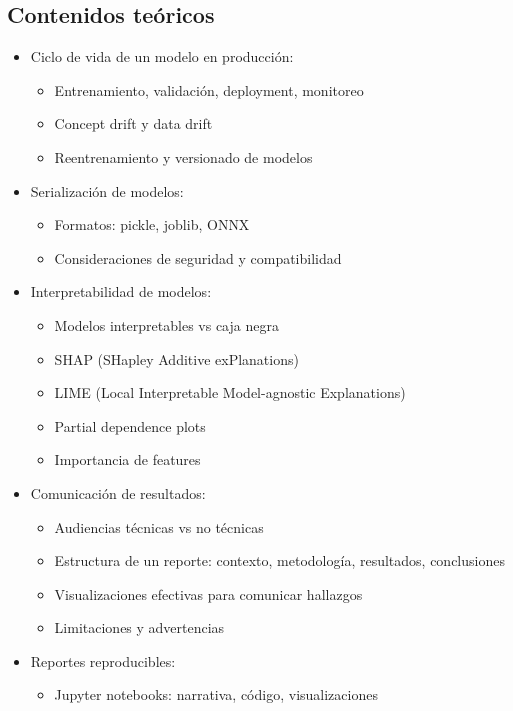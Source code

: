 \documentclass[a4paper,11pt]{article}
\begin{document}
\subsection{Contenidos teóricos}
\begin{itemize}[leftmargin=*]
    \item Ciclo de vida de un modelo en producción:
    \begin{itemize}
        \item Entrenamiento, validación, deployment, monitoreo
        \item Concept drift y data drift
        \item Reentrenamiento y versionado de modelos
    \end{itemize}
    \item Serialización de modelos:
    \begin{itemize}
        \item Formatos: pickle, joblib, ONNX
        \item Consideraciones de seguridad y compatibilidad
    \end{itemize}
    \item Interpretabilidad de modelos:
    \begin{itemize}
        \item Modelos interpretables vs caja negra
        \item SHAP (SHapley Additive exPlanations)
        \item LIME (Local Interpretable Model-agnostic Explanations)
        \item Partial dependence plots
        \item Importancia de features
    \end{itemize}
    \item Comunicación de resultados:
    \begin{itemize}
        \item Audiencias técnicas vs no técnicas
        \item Estructura de un reporte: contexto, metodología, resultados, conclusiones
        \item Visualizaciones efectivas para comunicar hallazgos
        \item Limitaciones y advertencias
    \end{itemize}
    \item Reportes reproducibles:
    \begin{itemize}
        \item Jupyter notebooks: narrativa, código, visualizaciones

\end{itemize}
\end{itemize}
\end{document}
